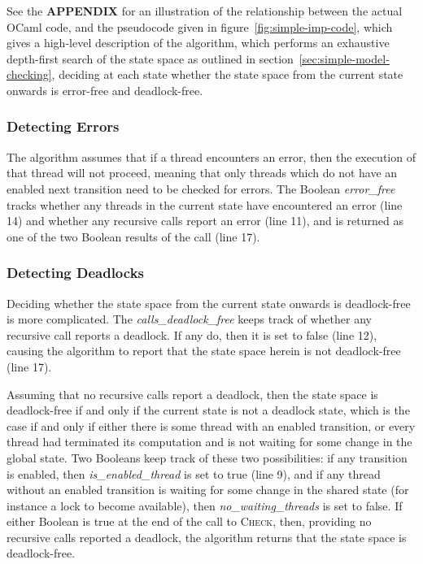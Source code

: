 \documentclass[12pt,a4paper,twoside,openright]{report}
\begin{document}
See the \textbf{APPENDIX} for an illustration
of the relationship between the actual OCaml
code, and the pseudocode given in
figure~\ref{fig:simple-imp-code}, which gives
a high-level description of the algorithm,
which performs an exhaustive depth-first
search of the state space as outlined in
section~\ref{sec:simple-model-checking},
deciding at each state whether the state space
from the current state onwards is error-free
and deadlock-free.

\subsubsection{Detecting Errors}

The algorithm assumes that if a thread
encounters an error, then the execution
of that thread will not proceed, meaning
that only threads which do not have an
enabled next transition need to be checked
for errors. The Boolean \textit{error\_free}
tracks whether any threads in the current state
have encountered an error (line 14) and whether any
recursive calls report an error (line 11), and is
returned as one of the two Boolean results
of the call (line 17).

\subsubsection{Detecting Deadlocks}

Deciding whether the state space from the current
state onwards is deadlock-free is more complicated.
The \textit{calls\_deadlock\_free} keeps track of
whether any recursive call reports a deadlock. If
any do, then it is set to false (line 12), causing the
algorithm to report that the state space herein
is not deadlock-free (line 17).

Assuming that no
recursive calls report a deadlock, then the state
space is deadlock-free if and only if the current
state is not a deadlock state, which is the case
if and only if either there is some thread with an
enabled transition,
or every thread had terminated its computation and
is not waiting for some change in the global state.
Two Booleans keep track of these two possibilities:
if any transition is enabled, then
\textit{is\_enabled\_thread} is set to true (line 9),
and if any thread without an enabled transition is
waiting for some change in the shared state (for
instance a lock to become available), then
\textit{no\_waiting\_threads} is set to false.
If either Boolean is true at the end of the call
to \textsc{Check}, then, providing no recursive
calls reported a deadlock, the algorithm returns
that the state space is deadlock-free.
\end{document}
